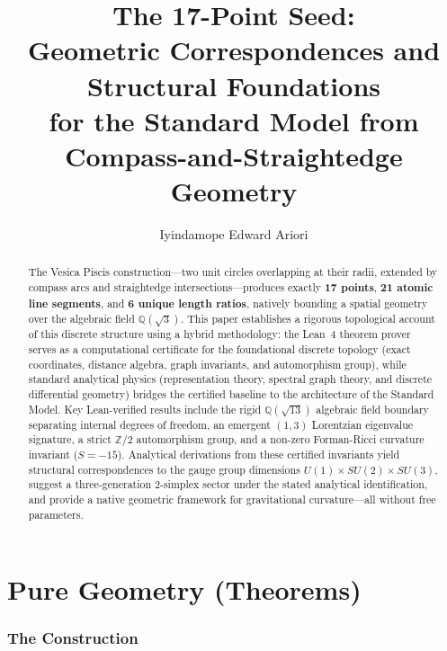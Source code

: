 \documentclass[12pt, a4paper]{article}
\title{\textbf{The 17-Point Seed:} \\ Geometric Correspondences and Structural Foundations \\ for the Standard Model from Compass-and-Straightedge Geometry}
\author{Iyindamope Edward Ariori}
\date{}
\begin{document}
\maketitle

\begin{abstract}
The Vesica Piscis construction---two unit circles overlapping at their radii, extended by compass arcs and straightedge intersections---produces exactly \textbf{17 points}, \textbf{21 atomic line segments}, and \textbf{6 unique length ratios}, natively bounding a spatial geometry over the algebraic field $\mathbb{Q}(\sqrt{3})$. This paper establishes a rigorous topological account of this discrete structure using a hybrid methodology: the Lean~4 theorem prover serves as a computational certificate for the foundational discrete topology (exact coordinates, distance algebra, graph invariants, and automorphism group), while standard analytical physics (representation theory, spectral graph theory, and discrete differential geometry) bridges the certified baseline to the architecture of the Standard Model. Key Lean-verified results include the rigid $\mathbb{Q}(\sqrt{13})$ algebraic field boundary separating internal degrees of freedom, an emergent $(1,3)$ Lorentzian eigenvalue signature, a strict $\mathbb{Z}/2$ automorphism group, and a non-zero Forman-Ricci curvature invariant ($S = -15$). Analytical derivations from these certified invariants yield structural correspondences to the gauge group dimensions $U(1) \times SU(2) \times SU(3)$, suggest a three-generation 2-simplex sector under the stated analytical identification, and provide a native geometric framework for gravitational curvature---all without free parameters.
\end{abstract}

\tableofcontents
\newpage

\part{Pure Geometry (Theorems)}

\section{The Construction}
\end{document}
